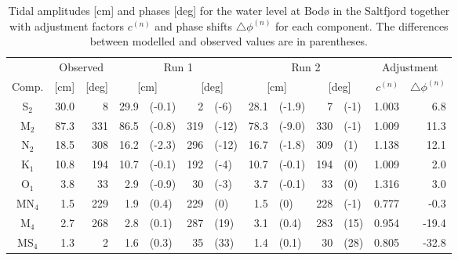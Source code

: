 \begin{table}[ht]
\caption{Tidal amplitudes [cm] and phases [deg] for the water level at Bod{\o} in the Saltfjord together with adjustment factors $c^{(n)}$ and phase shifts $\triangle \phi^{(n)}$ for each component. The differences between modelled and observed values are in parentheses.}
\label{tab:Bodo}
\centering
\begin{tabular}{crrr@{ }lr@{ }lr@{ }lr@{ }lrr} \hline
      & \multicolumn{2}{c}{Observed} & \multicolumn{4}{c}{Run 1} & \multicolumn{4}{c}{Run 2} & \multicolumn{2}{c}{Adjustment} \\
Comp. & [cm] & [deg] & \multicolumn{2}{c}{[cm]} & \multicolumn{2}{c}{[deg]} & \multicolumn{2}{c}{[cm]} & \multicolumn{2}{c}{[deg]} & $c^{(n)}$ & $\triangle \phi^{(n)}$  \\ \hline 
S$_2$   &  30.0 &      8   &  29.9 & (-0.1) &    2 & (-6)   &  28.1 & (-1.9) &    7 & (-1)  &   1.003  &     6.8   \\ 
M$_2$   &  87.3 &    331   &  86.5 & (-0.8) &  319 & (-12)  &  78.3 & (-9.0) &  330 & (-1)  &   1.009  &    11.3   \\ 
N$_2$   &  18.5 &    308   &  16.2 & (-2.3) &  296 & (-12)  &  16.7 & (-1.8) &  309 & (1)   &   1.138  &    12.1   \\ 
K$_1$   &  10.8 &    194   &  10.7 & (-0.1) &  192 & (-4)   &  10.7 & (-0.1) &  194 & (0)   &   1.009  &     2.0   \\ 
O$_1$   &   3.8 &     33   &   2.9 & (-0.9) &   30 & (-3)   &   3.7 & (-0.1) &   33 & (0)   &   1.316  &     3.0   \\ 
MN$_4$  &   1.5 &    229   &   1.9 & (0.4)  &  229 & (0)    &   1.5 & (0)    &  228 & (-1)  &   0.777  &    -0.3   \\ 
M$_4$   &   2.7 &    268   &   2.8 & (0.1)  &  287 & (19)   &   3.1 & (0.4)  &  283 & (15)  &   0.954  &   -19.4   \\ 
MS$_4$  &   1.3 &      2   &   1.6 & (0.3)  &   35 & (33)   &   1.4 & (0.1)  &   30 & (28)  &   0.805  &   -32.8   \\ \hline
\end{tabular}
\end{table}


